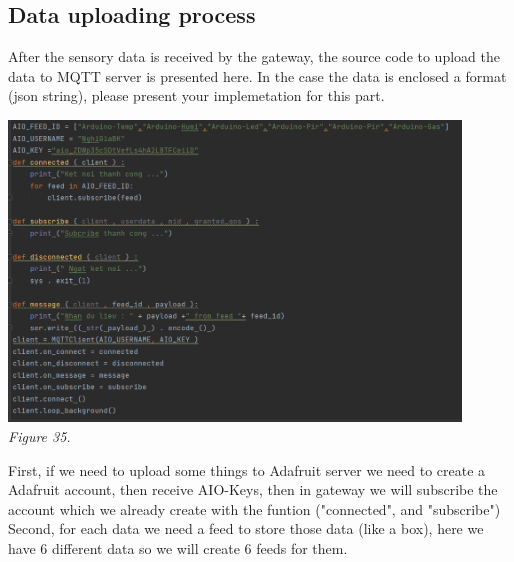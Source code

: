 \documentclass[a4paper]{article}
\begin{document}
\subsection{Data uploading process}
After the sensory data is received by the gateway, the source code to upload the data to MQTT server is presented here. In the case the data is enclosed a format (json string), please present your implemetation for this part.\\
\begin{center}
    \includegraphics[width=12cm]{pictures/Data_upload1.png}\\
    \textit{Figure 35.}\\
\end{center}
First, if we need to upload some things to Adafruit server we need to create a Adafruit account, then receive AIO-Keys, then in gateway we will subscribe the account which we already create with the funtion ("connected",  and "subscribe")
Second, for each data we need a feed to store those data (like a box), here we have 6 different data so we will create 6 feeds for them. \\
\end{document}
